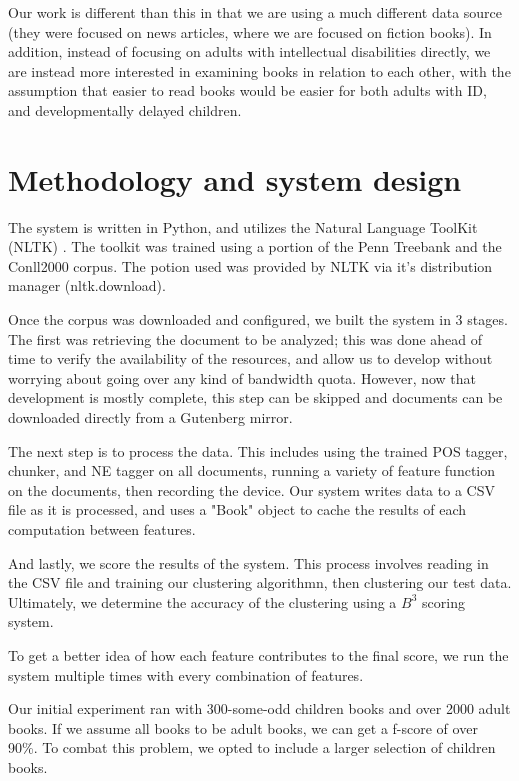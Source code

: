 \documentclass[]{article}
\begin{document}
Our work is different than this in that we are using a much different data source (they were focused on news articles, where we are focused on fiction books).
In addition, instead of focusing on adults with intellectual disabilities directly, we are instead more interested in examining books in relation to each other, with the assumption that easier to read books would be easier for both adults with ID, and developmentally delayed children.

\section{Methodology and system design}

The system is written in Python, and utilizes the Natural Language ToolKit (NLTK) \cite{loper2002nltk}.
The toolkit was trained using a portion of the Penn Treebank and the Conll2000 corpus.
The potion used was provided by NLTK via it's distribution manager (nltk.download).

Once the corpus was downloaded and configured, we built the system in 3 stages.
The first was retrieving the document to be analyzed; this was done ahead of time to verify the availability of the resources, and allow us to develop without worrying about going over any kind of bandwidth quota.
However, now that development is mostly complete, this step can be skipped and documents can be downloaded directly from a Gutenberg mirror.

The next step is to process the data.
This includes using the trained POS tagger, chunker, and NE tagger on all documents, running a variety of feature function on the documents, then recording the device.
Our system writes data to a CSV file as it is processed, and uses a "Book" object to cache the results of each computation between features.

And lastly, we score the results of the system.
This process involves reading in the CSV file and training our clustering algorithmn, then clustering our test data.
Ultimately, we determine the accuracy of the clustering using a $B^3$ scoring system.

To get a better idea of how each feature contributes to the final score, we run the system multiple times with every combination of features.

Our initial experiment ran with 300-some-odd children books and over 2000 adult books.
If we assume all books to be adult books, we can get a f-score of over 90\%.
To combat this problem, we opted to include a larger selection of children books.
\end{document}

